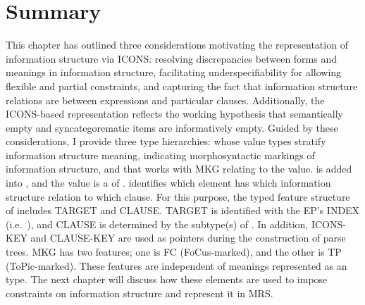 \section{Summary}
\label{9:sec:summary}

This chapter has outlined three considerations motivating the
representation of information structure via ICONS: resolving
discrepancies between forms and meanings in information structure,
facilitating underspecifiability for allowing flexible and partial
constraints, and capturing the fact that
information structure relations are between expressions and particular
clauses.  Additionally, the ICONS-based representation reflects the
working hypothesis that semantically empty and syncategorematic items
are informatively empty.  Guided by these considerations, I provide
three type hierarchies:  whose value types stratify
information structure meaning,  indicating morphosyntactic
markings of information structure, and
 that works with MKG relating to the 
value.  is added
into , and the value is a  of .
 identifies which element has which information structure
relation to which clause. For this purpose, the typed feature
structure of  includes TARGET and
CLAUSE. TARGET is identified with the EP's INDEX
(i.e.\ ), and CLAUSE is determined by the subtype(s)
of . In addition, ICONS-KEY and CLAUSE-KEY
are used as pointers during the construction of parse trees.  MKG has
two features; one is FC (FoCus-marked), and the other is TP
(ToPic-marked). These features are independent of meanings represented
as an  type.  The next chapter will discuss how these
elements are used to impose constraints on information structure and
represent it in MRS.























